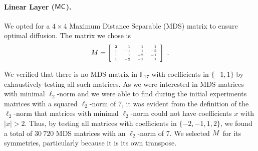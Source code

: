 \paragraph{Linear Layer ($\text{\textsf{MC}}$).} We opted for a $4 \times 4$ Maximum Distance Separable (MDS) matrix to ensure optimal diffusion. The matrix we chose is 
\begin{equation}
  \label{eq:mixmat}
  M = \left[ { \tiny
      \begin{array}{rrrr}
        2 & 1 & 1 & 1 \\
        1 & -1 &1 & -2 \\
        1 & 1 & -2 &-1 \\
        1 & -2 &-1 &1 \\
      \end{array}
    }\right]~.
\end{equation}

We verified that there is no MDS matrix in  $\mathbb{F}_{17}$ with coefficients in $\{-1,1\}$ by exhaustively  testing all such matrices. As we were interested in MDS matrices with minimal $\ell_2$-norm and we were able to find during the initial experiments  matrices with a squared $\ell_2$-norm of 7, it was evident from the definition of the $\ell_2$-norm that matrices with minimal $\ell_2$-norm could not have coefficients $x$ with $|x| > 2$.  Thus, by testing all matrices with coefficients in $\{-2,-1,1,2\}$, we found a total of $30\>720$ MDS matrices with an $\ell_2$-norm of 7. We selected $M$ for its symmetries, particularly because it is its own transpose. %

